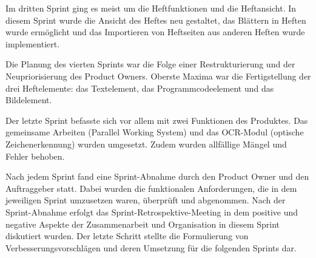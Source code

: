 
Im dritten Sprint ging es meist um die Heftfunktionen und die Heftansicht. In diesem Sprint wurde die Ansicht des Heftes neu gestaltet, das Blättern in Heften wurde ermöglicht und das Importieren von Heftseiten aus anderen Heften wurde implementiert.


\newpage

Die Planung des vierten Sprints war die Folge einer Restrukturierung und der Neupriorisierung des Product Owners. Oberste Maxima war die Fertigstellung der drei Heftelemente: das Textelement, das Programmcodeelement und das Bildelement.


Der letzte Sprint befasste sich vor allem mit zwei Funktionen des Produktes. Das gemeinsame Arbeiten (Parallel Working System) und das OCR-Modul (optische Zeichenerkennung) wurden umgesetzt. Zudem wurden allfällige Mängel und Fehler behoben.


Nach jedem Sprint fand eine Sprint-Abnahme durch den Product Owner und den Auftraggeber statt. Dabei wurden die funktionalen Anforderungen, die in dem jeweiligen Sprint umzusetzen waren, überprüft und abgenommen. Nach der Sprint-Abnahme erfolgt das Sprint-Retrospektive-Meeting in dem positive und negative Aspekte der Zusammenarbeit und Organisation in diesem Sprint diskutiert wurden. Der letzte Schritt stellte die Formulierung von Verbesserungsvorschlägen und deren Umsetzung für die folgenden Sprints dar.


